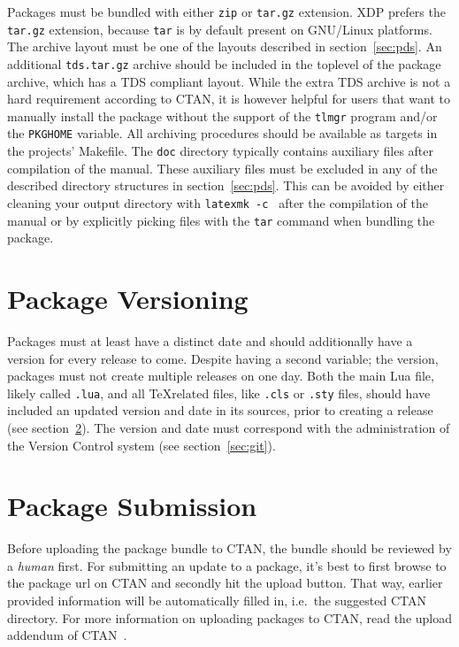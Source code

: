\documentclass{xdpdoc}
\begin{document}
\begin{multicols}{2}
        Packages must be bundled with either \texttt{zip} or \texttt{tar.gz} extension.
        XDP prefers the \texttt{tar.gz} extension, because \texttt{tar} is by default present on GNU/Linux platforms.
        The archive layout must be one of the layouts described in section~\ref{sec:pds}.
        An additional \texttt{tds.tar.gz} archive should be included in the toplevel of the package archive, which has a TDS compliant layout.
        While the extra TDS archive is not a hard requirement according to CTAN, it is however helpful for users that want to manually install the package without the support of the \texttt{tlmgr} program and/or the \texttt{PKGHOME} variable.
        All archiving procedures should be available as targets in the projects' Makefile.
        The \texttt{doc} directory typically contains auxiliary files after compilation of the manual.
        These auxiliary files must be excluded in any of the described directory structures in section~\ref{sec:pds}.
        This can be avoided by either cleaning your output directory with \texttt{latexmk -c } after the compilation of the manual or by explicitly picking files with the \texttt{tar} command when bundling the package.


        \section{Package Versioning}

        Packages must at least have a distinct date and should additionally have a version for every release to come.
        Despite having a second variable; the version, packages must not create multiple releases on one day.
        Both the main Lua file, likely called \texttt{.lua}, and all \TeX related files, like \texttt{.cls} or \texttt{.sty} files, should have included an updated version and date in its sources, prior to creating a release (see section~\ref{sec:submission}).
        The version and date must correspond with the administration of the Version Control system (see section~\ref{sec:git}).


        \section{Package Submission}\label{sec:submission}

        Before uploading the package bundle to CTAN, the bundle should be reviewed by a \textit{human} first.
        For submitting an update to a package, it's best to first browse to the package url on CTAN and secondly hit the upload button.
        That way, earlier provided information will be automatically filled in, i.e.\ the suggested CTAN directory.
        For more information on uploading packages to CTAN, read the upload addendum of CTAN~\cite{ctan:help:addendum}.



\end{multicols}
\end{document}
